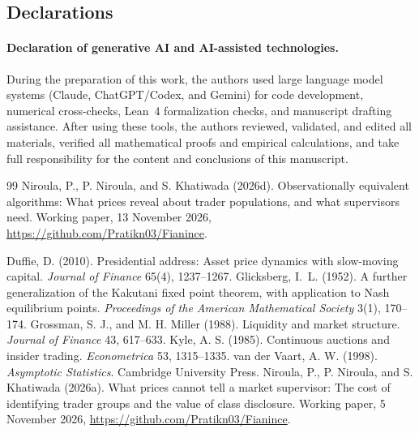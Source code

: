 \documentclass[12pt]{article}
\theoremstyle{definition}
\theoremstyle{remark}
\begin{document}
\subsection*{Declarations}

\paragraph{Declaration of generative AI and AI-assisted technologies.} During the preparation of this work, the authors used large language model systems (Claude, ChatGPT/Codex, and Gemini) for code development, numerical cross-checks, Lean~4 formalization checks, and manuscript drafting assistance. After using these tools, the authors reviewed, validated, and edited all materials, verified all mathematical proofs and empirical calculations, and take full responsibility for the content and conclusions of this manuscript.


\begin{thebibliography}{99}\setlength{\itemsep}{2pt}\small
{} Niroula, P., P. Niroula, and S. Khatiwada (2026d). Observationally equivalent algorithms: What prices reveal about trader populations, and what supervisors need. Working paper, 13 November 2026, \url{https://github.com/Pratikn03/Fianince}.

 Duffie, D. (2010). Presidential address: Asset price dynamics with slow-moving capital. \emph{Journal of Finance} 65(4), 1237--1267.
 Glicksberg, I.~L. (1952). A further generalization of the Kakutani fixed point theorem, with application to Nash equilibrium points. \emph{Proceedings of the American Mathematical Society} 3(1), 170--174.
 Grossman, S. J., and M. H. Miller (1988). Liquidity and market structure. \emph{Journal of Finance} 43, 617--633.
 Kyle, A. S. (1985). Continuous auctions and insider trading. \emph{Econometrica} 53, 1315--1335.
 van der Vaart, A. W. (1998). \emph{Asymptotic Statistics}. Cambridge University Press.
 Niroula, P., P. Niroula, and S. Khatiwada (2026a). What prices cannot tell a market supervisor: The cost of identifying trader groups and the value of class disclosure. Working paper, 5 November 2026, \url{https://github.com/Pratikn03/Fianince}.


\end{thebibliography}
\end{document}
